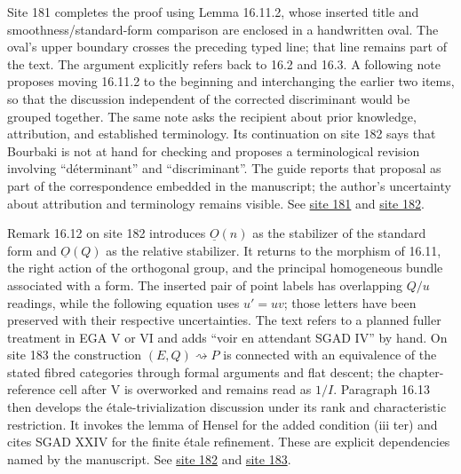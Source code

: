 Site 181 completes the proof using Lemma 16.11.2, whose inserted title and smoothness/standard-form comparison are enclosed in a handwritten oval. The oval's upper boundary crosses the preceding typed line; that line remains part of the text. The argument explicitly refers back to 16.2 and 16.3. A following note proposes moving 16.11.2 to the beginning and interchanging the earlier two items, so that the discussion independent of the corrected discriminant would be grouped together. The same note asks the recipient about prior knowledge, attribution, and established terminology. Its continuation on site 182 says that Bourbaki is not at hand for checking and proposes a terminological revision involving ``déterminant'' and ``discriminant''. The guide reports that proposal as part of the correspondence embedded in the manuscript; the author's uncertainty about attribution and terminology remains visible. See \href{https://grothendieck.umontpellier.fr/web/viewer.html?file=../25.pdf#page=182}{site 181} and \href{https://grothendieck.umontpellier.fr/web/viewer.html?file=../25.pdf#page=183}{site 182}.

Remark 16.12 on site 182 introduces \(\underline O(n)\) as the stabilizer of the standard form and \(\underline O(Q)\) as the relative stabilizer. It returns to the morphism of 16.11, the right action of the orthogonal group, and the principal homogeneous bundle associated with a form. The inserted pair of point labels has overlapping \(Q/u\) readings, while the following equation uses \(u'=uv\); those letters have been preserved with their respective uncertainties. The text refers to a planned fuller treatment in EGA V or VI and adds ``voir en attendant SGAD IV'' by hand. On site 183 the construction \((E,Q)\rightsquigarrow P\) is connected with an equivalence of the stated fibred categories through formal arguments and flat descent; the chapter-reference cell after V is overworked and remains read as \(1/I\). Paragraph 16.13 then develops the étale-trivialization discussion under its rank and characteristic restriction. It invokes the lemma of Hensel for the added condition (iii ter) and cites SGAD XXIV for the finite étale refinement. These are explicit dependencies named by the manuscript. See \href{https://grothendieck.umontpellier.fr/web/viewer.html?file=../25.pdf#page=183}{site 182} and \href{https://grothendieck.umontpellier.fr/web/viewer.html?file=../25.pdf#page=184}{site 183}.

